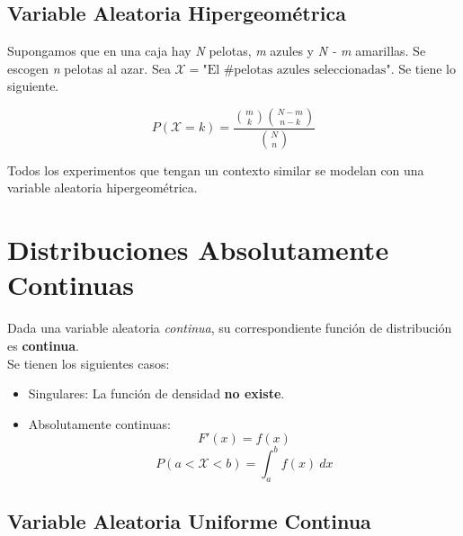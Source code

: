 
\subsection{Variable Aleatoria Hipergeométrica}

Supongamos que en una caja hay \textit N pelotas, \textit m azules y \textit{N - m} amarillas. Se escogen \textit n pelotas al azar.  Sea $\mathcal X = \text{"El \#pelotas azules seleccionadas"}$. Se tiene lo siguiente.

\[P(\mathcal X = k) = \frac{\binom{m}{k} \binom{N - m}{n-k} }{\binom{N}{n}}\]

Todos los experimentos que tengan un contexto similar se modelan con una variable aleatoria hipergeométrica.


\section{Distribuciones Absolutamente Continuas}
Dada una variable aleatoria \textit{continua}, su correspondiente función de distribución es \textbf{continua}.\\
Se tienen los siguientes casos:
\begin{itemize}
  \item Singulares: La función de densidad \textbf{no existe}. 
  \item Absolutamente continuas: \[F'(x) = f(x)\] \[P(a < \mathcal X < b) = \int_a^b f(x)~dx\]
\end{itemize}

\subsection{Variable Aleatoria Uniforme Continua}

